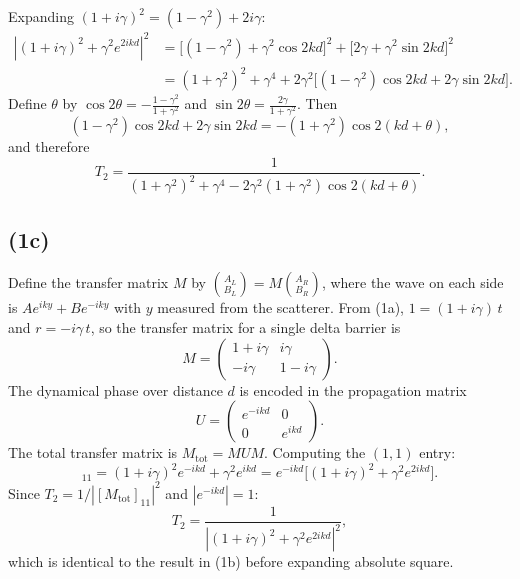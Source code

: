 \documentclass[a4paper,11pt]{article}
\begin{document}
Expanding $(1+i\gamma)^2 = (1-\gamma^2) + 2i\gamma$:
\begin{align}
    \left|(1 + i\gamma)^2 + \gamma^2 e^{2ikd}\right|^2
    &= \big[(1 - \gamma^2) + \gamma^2\cos 2kd\big]^2 + \big[2\gamma + \gamma^2\sin 2kd\big]^2 \nonumber\\
    &= (1 + \gamma^2)^2 + \gamma^4 + 2\gamma^2\big[(1 - \gamma^2)\cos 2kd + 2\gamma\sin 2kd\big].
\end{align}
Define $\theta$ by $\cos 2\theta = -\frac{1-\gamma^2}{1+\gamma^2}$ and $\sin 2\theta = \frac{2\gamma}{1+\gamma^2}$. Then
\begin{equation}
    (1-\gamma^2)\cos 2kd + 2\gamma\sin 2kd = -(1+\gamma^2)\cos 2(kd+\theta),
\end{equation}
and therefore
\begin{equation}
    T_2 = \frac{1}{(1+\gamma^2)^2 + \gamma^4 - 2\gamma^2(1+\gamma^2)\cos 2(kd+\theta)}. \label{eqn:T2-formula}
\end{equation}


\subsection{(1c)}

Define the transfer matrix $M$ by $\binom{A_L}{B_L} = M\binom{A_R}{B_R}$, where the wave on each side is $Ae^{iky} + Be^{-iky}$ with $y$ measured from the scatterer. From (1a), $1 = (1+i\gamma)\,t$ and $r = -i\gamma\, t$, so the transfer matrix for a single delta barrier is
\begin{equation}
    M = \begin{pmatrix} 1+i\gamma & i\gamma \\ -i\gamma & 1-i\gamma \end{pmatrix}.
\end{equation}
The dynamical phase over distance $d$ is encoded in the propagation matrix
\begin{equation}
    U = \begin{pmatrix} e^{-ikd} & 0 \\ 0 & e^{ikd} \end{pmatrix}.
\end{equation}
The total transfer matrix is $M_\mathrm{tot} = M U M$. Computing the $(1,1)$ entry:
\begin{equation}
    [M_\mathrm{tot}]_{11} = (1+i\gamma)^2 e^{-ikd} + \gamma^2 e^{ikd} = e^{-ikd}\big[(1+i\gamma)^2 + \gamma^2 e^{2ikd}\big].
\end{equation}
Since $T_2 = 1/|[M_\mathrm{tot}]_{11}|^2$ and $|e^{-ikd}| = 1$:
\begin{equation}
    T_2 = \frac{1}{\left|(1+i\gamma)^2 + \gamma^2 e^{2ikd}\right|^2},
\end{equation}
which is identical to the result in (1b) before expanding absolute square.
\end{document}
